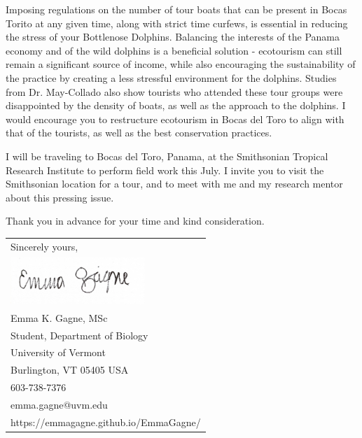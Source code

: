 \documentclass[10pt]{article}\usepackage[]{graphicx}\usepackage[]{color}
\begin{document}
Imposing regulations on the number of tour boats that can be present in Bocas Torito at any given time, along with strict time curfews, is essential in reducing the stress of your Bottlenose Dolphins. Balancing the interests of the Panama economy and of the wild dolphins is a beneficial solution -  ecotourism can still remain a significant source of income, while also encouraging the sustainability of the practice by creating a less stressful environment for the dolphins. Studies from Dr. May-Collado also show tourists who attended these tour groups were disappointed by the density of boats, as well as the approach to the dolphins. I would encourage you to restructure ecotourism in Bocas del Toro to align with that of the tourists, as well as the best conservation practices. 

I will be traveling to Bocas del Toro, Panama, at the Smithsonian Tropical Research Institute to perform field work this July. I invite you to visit the Smithsonian location for a tour, and to meet with me and my research mentor about this pressing issue. 

Thank you in advance for your time and kind consideration.


\begin{tabular}{@{}l}
Sincerely yours,\\
\includegraphics[scale=0.15,width=2in]{MySignature.jpg}\\
Emma K. Gagne, MSc\\
Student, Department of Biology\\
University of Vermont\\
Burlington, VT 05405 USA\\
603-738-7376\\
emma.gagne@uvm.edu\\
https://emmagagne.github.io/EmmaGagne/\\
\end{tabular}
\end{document}
